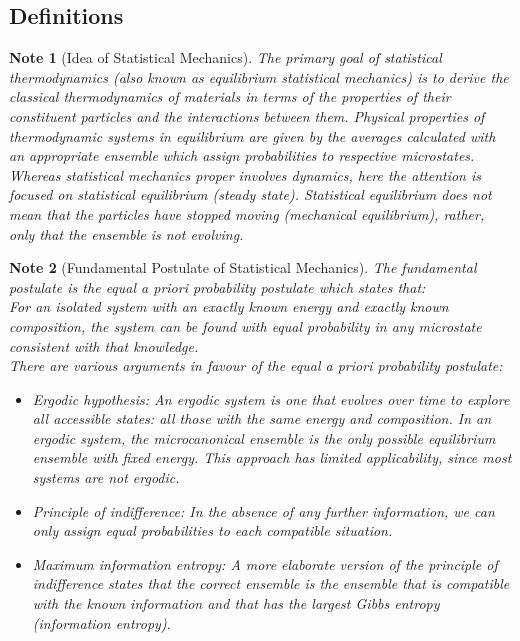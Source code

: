 \documentclass[a4paper]{article}
\newtheorem{Note}{Note}[section]
\theoremstyle{new}
\begin{document}
\subsection{Definitions}
\begin{Note}[Idea of Statistical Mechanics]
The primary goal of statistical thermodynamics (also known as equilibrium statistical mechanics) is to derive the classical thermodynamics of materials in terms of the properties of their constituent particles and the interactions between them. Physical properties of thermodynamic systems in equilibrium are given by the averages calculated with an appropriate ensemble which assign probabilities to respective microstates. Whereas statistical mechanics proper involves dynamics, here the attention is focused on statistical equilibrium (steady state). Statistical equilibrium does not mean that the particles have stopped moving (mechanical equilibrium), rather, only that the ensemble is not evolving.
\end{Note}
\begin{Note}[Fundamental Postulate of Statistical Mechanics]
The fundamental postulate is the \emph{equal a priori probability postulate} which states that:\\[5pt]
\emph{For an isolated system with an exactly known energy and exactly known composition, the system can be found with equal probability in any microstate consistent with that knowledge.}\\[5pt]
There are various arguments in favour of the equal a priori probability postulate:
\begin{itemize}
    \item Ergodic hypothesis: An ergodic system is one that evolves over time to explore all accessible states: all those with the same energy and composition. In an ergodic system, the microcanonical ensemble is the only possible equilibrium ensemble with fixed energy. This approach has limited applicability, since most systems are not ergodic.
    \item Principle of indifference: In the absence of any further information, we can only assign equal probabilities to each compatible situation.
    \item Maximum information entropy: A more elaborate version of the principle of indifference states that the correct ensemble is the ensemble that is compatible with the known information and that has the largest Gibbs entropy (information entropy).
\end{itemize}
\end{Note}
\end{document}
